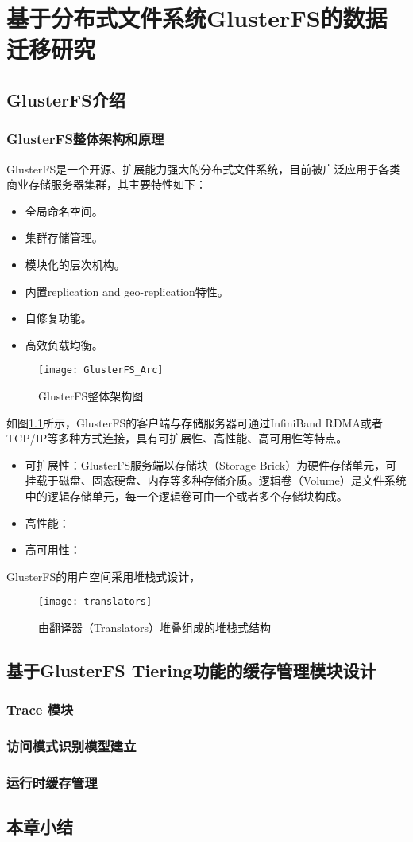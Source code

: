\chapter{基于分布式文件系统GlusterFS的数据迁移研究}

\section{GlusterFS介绍}

\subsection{GlusterFS整体架构和原理}


GlusterFS\cite{GlusterFS}是一个开源、扩展能力强大的分布式文件系统，目前被广泛应用于各类商业存储服务器集群，其主要特性如下：
\begin{itemize}
    \item 全局命名空间。
    \item 集群存储管理。
    \item 模块化的层次机构。
    \item 内置replication and geo-replication特性。
    \item 自修复功能。
    \item 高效负载均衡。
\end{itemize}
\begin{figure}[htp]
\centering
\texttt{[image: GlusterFS\_Arc]}
\caption{GlusterFS整体架构图}
\label{fig:GlusterFS_Arc}
\end{figure}
如图\ref{fig:GlusterFS_Arc}所示，GlusterFS的客户端与存储服务器可通过InfiniBand RDMA或者TCP/IP等多种方式连接，具有可扩展性、高性能、高可用性等特点。
\begin{itemize}
    \item 可扩展性：GlusterFS服务端以存储块（Storage Brick）为硬件存储单元，可挂载于磁盘、固态硬盘、内存等多种存储介质。逻辑卷（Volume）是文件系统中的逻辑存储单元，每一个逻辑卷可由一个或者多个存储块构成。
    \item 高性能：
    \item 高可用性：
\end{itemize}
GlusterFS的用户空间采用堆栈式设计，

\begin{figure}[htp]
\centering
\texttt{[image: translators]}
\caption{由翻译器（Translators）堆叠组成的堆栈式结构}
\label{fig:translators}
\end{figure}
\section{基于GlusterFS Tiering功能的缓存管理模块设计}
\subsection{Trace 模块}
\subsection{访问模式识别模型建立}
\subsection{运行时缓存管理}


\section{本章小结}